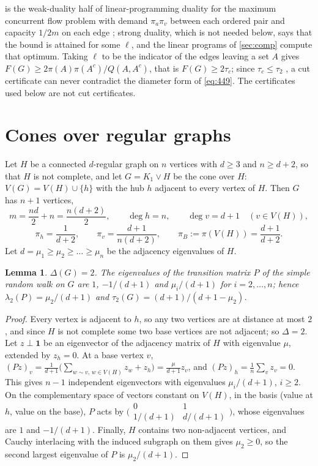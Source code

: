 \documentclass[11pt]{amsart}
\newtheorem{lemma}[theorem]{Lemma}
\theoremstyle{definition}
\begin{document}
 is the weak-duality half of linear-programming duality for the maximum concurrent flow problem with demand $\pi_a\pi_v$ between each ordered pair and capacity $1/2m$ on each edge \cite{SM,LR}; strong duality, which is not needed below, says that the bound is attained for some $\ell$, and the linear programs of \cref{sec:comp} compute that optimum. Taking $\ell$ to be the indicator of the edges leaving a set $A$ gives $F(G)\ge2\pi(A)\pi(A^c)/Q(A,A^c)$, that is $F(G)\ge2\tau_c$; since $\tau_c\le\tau_2$ \cite[Section~4.5]{AF}, a cut certificate can never contradict the diameter form of \eqref{eq:449}. The certificates used below are not cut certificates.

\section{Cones over regular graphs}\label{sec:cones}

Let $H$ be a connected $d$-regular graph on $n$ vertices with $d\ge3$ and $n\ge d+2$, so that $H$ is not complete, and let $G=K_1\vee H$ be the cone over $H$: $V(G)=V(H)\cup\{h\}$ with the hub $h$ adjacent to every vertex of $H$. Then $G$ has $n+1$ vertices,
\[
m=\frac{nd}2+n=\frac{n(d+2)}2,\qquad \deg h=n,\qquad \deg v=d+1\quad(v\in V(H)),
\]
\[
\pi_h=\frac1{d+2},\qquad \pi_v=\frac{d+1}{n(d+2)},\qquad \pi_B:=\pi(V(H))=\frac{d+1}{d+2}.
\]
Let $d=\mu_1\ge\mu_2\ge\dots\ge\mu_n$ be the adjacency eigenvalues of $H$.

\begin{lemma}\label{lem:spectrum}
$\Delta(G)=2$. The eigenvalues of the transition matrix $P$ of the simple random walk on $G$ are $1$, $-1/(d+1)$ and $\mu_i/(d+1)$ for $i=2,\dots,n$; hence $\lambda_2(P)=\mu_2/(d+1)$ and $\tau_2(G)=(d+1)/(d+1-\mu_2)$.
\end{lemma}

\begin{proof}
Every vertex is adjacent to $h$, so any two vertices are at distance at most $2$, and since $H$ is not complete some two base vertices are not adjacent; so $\Delta=2$. Let $z\perp\mathbf1$ be an eigenvector of the adjacency matrix of $H$ with eigenvalue $\mu$, extended by $z_h=0$. At a base vertex $v$, $(Pz)_v=\frac1{d+1}\bigl(\sum_{w\sim v,\,w\in V(H)}z_w+z_h\bigr)=\frac{\mu}{d+1}z_v$, and $(Pz)_h=\frac1n\sum_vz_v=0$. This gives $n-1$ independent eigenvectors with eigenvalues $\mu_i/(d+1)$, $i\ge2$. On the complementary space of vectors constant on $V(H)$, in the basis (value at $h$, value on the base), $P$ acts by $\bigl(\begin{smallmatrix}0&1\\ 1/(d+1)&d/(d+1)\end{smallmatrix}\bigr)$, whose eigenvalues are $1$ and $-1/(d+1)$. Finally, $H$ contains two non-adjacent vertices, and Cauchy interlacing with the induced subgraph on them gives $\mu_2\ge0$, so the second largest eigenvalue of $P$ is $\mu_2/(d+1)$.
\end{proof}
\end{document}
